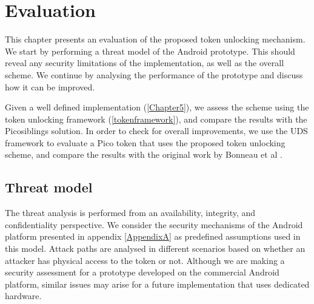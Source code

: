 
\chapter{Evaluation} %

\label{Chapter6} %


This chapter presents an evaluation of the proposed token unlocking mechanism. We start by performing a threat model of the Android prototype. This should reveal any security limitations of the implementation, as well as the overall scheme. We continue by analysing the performance of the prototype and discuss how it can be improved.

Given a well defined implementation (\ref{Chapter5}), we assess the scheme using the token unlocking framework (\ref{tokenframework}), and compare the results with the Picosiblings solution. In order to check for overall improvements, we use the UDS framework to evaluate a Pico token that uses the proposed token unlocking scheme, and compare the results with the original work by Bonneau et al \cite{bonneau2012quest}.

\section{Threat model}

The threat analysis is performed from an availability, integrity, and confidentiality perspective. We consider the security mechanisms of the Android platform presented in appendix \ref{AppendixA} as predefined assumptions used in this model. Attack paths are analysed in different scenarios based on whether an attacker has physical access to the token or not. Although we are making a security assessment for a prototype developed on the commercial Android platform, similar issues may arise for a future implementation that uses dedicated hardware.

